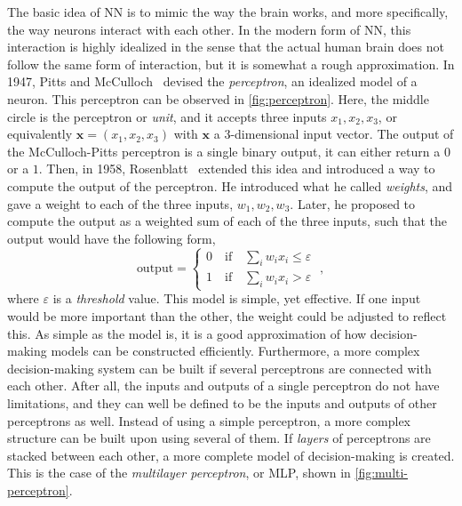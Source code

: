 The basic idea of NN is to mimic the way the brain works, and more specifically, the way 
neurons interact with each other. In the modern form of NN, this interaction is highly 
idealized in the sense that the actual human brain does not follow the same form of 
interaction, but it is somewhat a rough approximation. In 1947, Pitts and McCulloch~\cite{pittsHowWeKnow1947} devised the \emph{perceptron}, an idealized model of a neuron. This perceptron can be observed in \autoref{fig:perceptron}. Here, the middle circle is the perceptron or \emph{unit}, and it accepts three inputs \(x_1, x_2, x_3\), or equivalently \(\bm{x}=(x_1, x_2, x_3)\) with \(\bm{x}\) a \(3\)-dimensional input vector. The output of the McCulloch-Pitts perceptron is a single binary output, it can either return a \(0\) or a \(1\). Then, in 1958, Rosenblatt~\cite{rosenblattPerceptronProbabilisticModel1958} extended this idea and introduced a way to compute the output of the perceptron. He introduced what he called \emph{weights}, and gave a weight to each of the three inputs, \(w_1, w_2, w_3\). Later, he proposed to compute the output as a weighted sum of each of the three inputs, such that the output would have the following form,
\begin{equation}
    \text{output} = \begin{cases}
        0 \quad \text{if} \quad \sum_{i} w_i x_i \leq \varepsilon \\
        1 \quad \text{if} \quad \sum_{i} w_i x_i > \varepsilon
    \end{cases}
    \; ,
    \label{eq:output-perceptron}
\end{equation}
where \(\varepsilon\) is a \emph{threshold} value. This model is simple, yet effective. If 
one input would be more important than the other, the weight could be adjusted to reflect 
this. As simple as the model is, it is a good approximation of how decision-making models 
can be constructed efficiently. Furthermore, a more complex decision-making system can be built if several perceptrons are connected with each other. After all, the inputs and outputs of a single perceptron do not have limitations, and they can well be defined to be the inputs and outputs of other perceptrons as well. Instead of using a simple perceptron, a more complex structure can be built upon using several of them. If \emph{layers} of perceptrons are stacked between each other, a more complete model of decision-making is created. This is the case of the \emph{multilayer perceptron}, or MLP, shown in \autoref{fig:multi-perceptron}.

